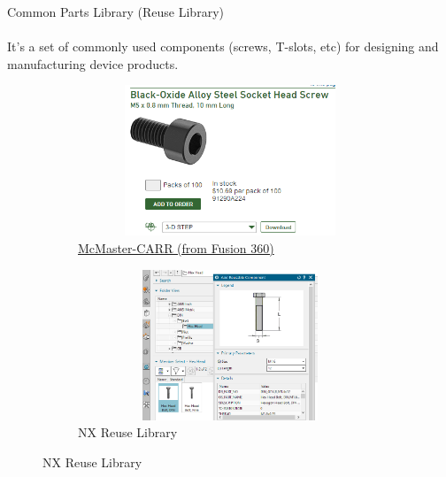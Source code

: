 \documentclass[aspectratio=169]{beamer}
\begin{document}
\begin{frame}[t]{Common Parts Library (Reuse Library)}
    \framesubtitle{}
    \vspace{-0.3cm}

    It's a set of commonly used components (screws, T-slots, etc) for designing and manufacturing device products.

    \begin{figure}[H]
        \begin{subfigure}{0.49\textwidth}
            \centering\includegraphics[height=4.5cm,width=1\textwidth,keepaspectratio]{cpl_1.png}
            \caption*{\href{https://www.mcmaster.com/}{McMaster-CARR (from Fusion 360)}}
            \label{fig:cpl_1.png}
        \end{subfigure}
        \begin{subfigure}{0.49\textwidth}
            \centering\includegraphics[height=4.5cm,width=1\textwidth,keepaspectratio]{cpl_2.png}
            \caption*{NX Reuse Library}
            \label{fig:cpl_2.png}
        \end{subfigure}
    \end{figure}
\end{frame}
\end{document}
